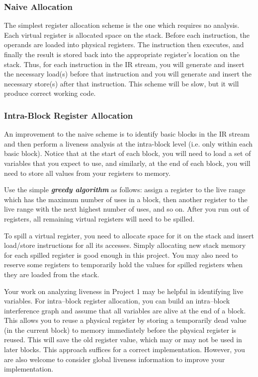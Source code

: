 \documentclass[12pt]{article}
\begin{document}

\subsubsection{Naive Allocation}\label{sec:naive}

The simplest register allocation scheme is the one which requires no analysis. Each virtual register is allocated space on the stack. Before each instruction, the operands are loaded into physical registers. The instruction then executes, and finally the result is stored back into the appropriate register's location on the stack. Thus, for each instruction in the IR stream, you will generate and insert the necessary load(s) before that instruction and you will generate and insert the necessary store(s) after that instruction. This scheme will be slow, but it will produce correct working code.
 
 \subsubsection{Intra-Block Register Allocation}\label{sec:block}
 
An improvement to the naive scheme is to identify basic blocks in the IR stream
and then perform a liveness analysis at the intra-block level (i.e. only within each basic block). Notice that at the start of each block, you will need to load a set of variables that you expect to use, and similarly, at the end of each block, you will need to store all values from your registers to memory.

Use the simple \textit{\textbf{greedy algorithm}} as follows: assign a register to the live range which has the maximum number of uses in a block, then another register to the live range with the next highest number of uses, and so on. After you run out of registers, all remaining virtual registers will need to be spilled.

To spill a virtual register, you need to allocate space for it on the stack and insert load/store instructions for all its accesses. Simply allocating new stack memory for each spilled register is good enough in this project. You may also need to reserve some registers to temporarily hold the values for spilled registers when they are loaded from the stack.

Your work on analyzing liveness in Project 1 may be helpful in identifying live variables. For intra--block register allocation, you can build an intra--block interference graph and assume that all variables are alive at the end of a block. This allows you to reuse a physical register by storing a temporarily dead value (in the current block) to memory immediately before the physical register is reused. This will save the old register value, which may or may not be used in later blocks. This approach suffices for a correct implementation. However, you are also welcome to consider global liveness information to improve your implementation.
\end{document}
